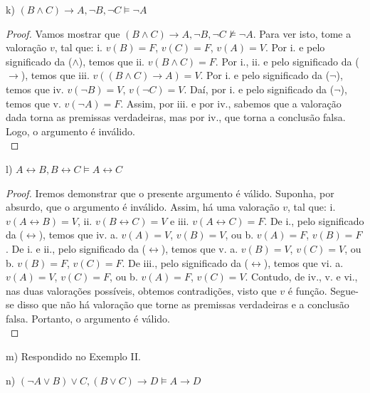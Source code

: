 \documentclass[12pt]{exam}
\begin{document}
\bigskip

k) $(B\land C) \rightarrow A, \neg B, \neg C\vDash \neg A$

\begin{proof}
Vamos mostrar que  $(B\land C) \rightarrow A, \neg B, \neg C\nvDash \neg A$. Para ver isto, tome a valoração $v$, tal que:
i. $v(B)=F$, $v(C)=F$, $v(A)=V$. Por i. e pelo significado da ($\land$), temos que ii. $v(B\land C)=F$. Por i., ii. e pelo significado da ($\rightarrow$), temos que iii. $v((B\land C) \rightarrow A)=V$. Por i. e pelo significado da ($\neg$), temos que iv. $v(\neg B)=V$, $v(\neg C)=V$. Daí, por i. e pelo significado da ($\neg$), temos que v. $v(\neg A)=F$. Assim, por iii. e por iv., sabemos que a valoração dada torna as premissas verdadeiras, mas por iv., que torna a conclusão falsa. Logo, o argumento é inválido.\\
\end{proof}

\bigskip

l)  $A \leftrightarrow B, B\leftrightarrow C\vDash A\leftrightarrow C$

\begin{proof}
Iremos demonstrar que o presente argumento é válido. Suponha, por absurdo, que o argumento é inválido. Assim, há uma valoração $v$, tal que:
i. $v(A\leftrightarrow B)=V$, 
ii. $v(B\leftrightarrow C)=V$ e 
iii. $v(A\leftrightarrow C)=F$. De i., pelo significado da ($\leftrightarrow$), temos que iv. a. $v(A)=V$, $v(B)=V$, ou b. $v(A)=F$, $v(B)=F$. De i. e ii., pelo significado da ($\leftrightarrow$), temos que v. a. $v(B)=V$, $v(C)=V$, ou b. $v(B)=F$, $v(C)=F$. De iii., pelo significado da ($\leftrightarrow$), temos que vi. a. $v(A)=V$, $v(C)=F$, ou b. $v(A)=F$, $v(C)=V$. Contudo, de iv., v. e vi., nas duas valorações possíveis, obtemos contradições, visto que $v$ é função. Segue-se disso que não há valoração que torne as premissas verdadeiras e a conclusão falsa. Portanto, o argumento é válido.\\
\end{proof}

\bigskip

m) Respondido no Exemplo II.\\

\bigskip

\pagebreak

n) $(\neg A \lor B)\lor C, (B\lor C)\rightarrow D\vDash A\rightarrow D$
\end{document}
